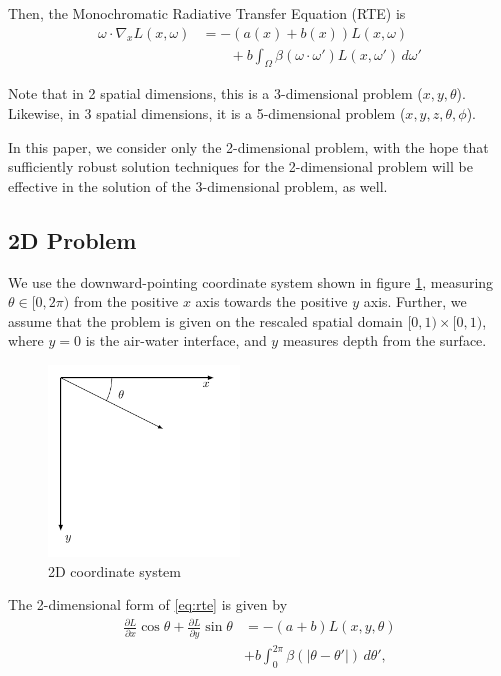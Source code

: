\documentclass[10pt]{article}
\newcommand\abs[1]{\left| #1 \right|}
\newcommand\pd[2]{\frac{\partial #1}{\partial #2}}
\begin{document}
\begin{multicols}{2}
Then, the Monochromatic Radiative Transfer Equation (RTE) is
\begin{equation}
	\label{eq:rte}
	\begin{aligned}
		\omega \cdot \nabla_x L(x,\omega) &= -(a(x) + b(x)) L(x,\omega) \\
		&\qquad + b \int_\Omega \beta(\omega \cdot \omega') L(x,\omega')\, d\omega'
	\end{aligned}
\end{equation}

Note that in 2 spatial dimensions, this is a 3-dimensional problem ($x,y,\theta$).
Likewise, in 3 spatial dimensions, it is a 5-dimensional problem ($x,y,z,\theta,\phi$).

In this paper, we consider only the 2-dimensional problem, with the hope that sufficiently robust solution techniques for the 2-dimensional problem will be effective in the solution of the 3-dimensional problem, as well.

\subsection{2D Problem}
\label{sec:2d}
We use the downward-pointing coordinate system shown in figure \ref{fig:coords}, measuring $\theta \in [0,2\pi)$ from the positive $x$ axis towards the positive $y$ axis.
Further, we assume that the problem is given on the rescaled spatial domain $[0,1) \times [0,1)$, where $y=0$ is the air-water interface, and $y$ measures depth from the surface.

\begin{figure}[H]
	\centering
	\includegraphics[width=2in]{2d_coords}
	\caption{2D coordinate system}
	\label{fig:coords}
\end{figure}

The 2-dimensional form of \eqref{eq:rte} is given by
\begin{equation}
	\begin{aligned}
		\pd{L}{x} \cos\theta + \pd{L}{y} \sin\theta
		&= -(a+b)L(x,y,\theta) \\
		&+ b\int_0^{2\pi} \beta(\abs{\theta-\theta'})\,d\theta',
	\end{aligned}
	\label{eq:rte2d}
\end{equation}


\end{multicols}
\end{document}
